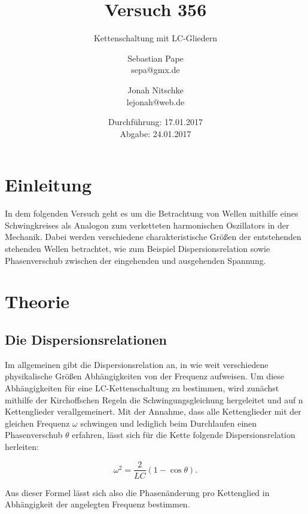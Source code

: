 

\title{Versuch 356}
\subtitle{Kettenschaltung mit LC-Gliedern}
\author{Sebastian Pape\\
        sepa@gmx.de \and
        Jonah Nitschke\\
        lejonah@web.de}
\date{Durchführung: 17.01.2017\\
      Abgabe: 24.01.2017}


\maketitle

\section{Einleitung}

In dem folgenden Versuch geht es um die Betrachtung von Wellen mithilfe eines
Schwingkreises als Analogon zum verketteten harmonischen Oszillators in der
Mechanik. Dabei werden verschiedene charakteristische Größen der entstehenden
stehenden Wellen betrachtet, wie zum Beispiel Dispersionsrelation sowie Phasenverschub
zwischen der eingehenden und ausgehenden Spannung.

\section{Theorie}

\subsection{Die Dispersionsrelationen}

Im allgemeinen gibt die Dispersionsrelation an, in wie weit verschiedene physikalische
Größen Abhängigkeiten von der Frequenz aufweisen. Um diese Abhängigkeiten für
eine LC-Kettenschaltung zu bestimmen, wird zunächst mithilfe der Kirchoffschen
Regeln die Schwingungsgleichung hergeleitet und auf n Kettenglieder verallgemeinert.
Mit der Annahme, dass alle Kettenglieder mit der gleichen Frequenz $\omega$ schwingen
und lediglich beim Durchlaufen einen Phasenverschub $\theta$ erfahren, lässt sich
für die Kette folgende Dispersionsrelation herleiten:

\begin{equation}
  \omega^2 = \frac{2}{LC}(1-\cos{\theta}) .
  \label{eqn:RelationC}
\end{equation}

Aus dieser Formel lässt sich also die Phasenänderung pro Kettenglied in Abhängigkeit
der angelegten Frequenz bestimmen.

